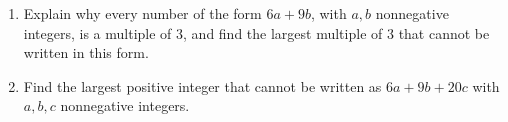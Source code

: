 \begin{enumerate}
\item[(a)] Explain why every number of the form $6a+9b$, with $a,b$ nonnegative integers, is a multiple of $3$, and find the largest multiple of $3$ that cannot be written in this form.
\item[(b)] Find the largest positive integer that cannot be written as $6a+9b+20c$ with $a,b,c$ nonnegative integers.
\end{enumerate}
